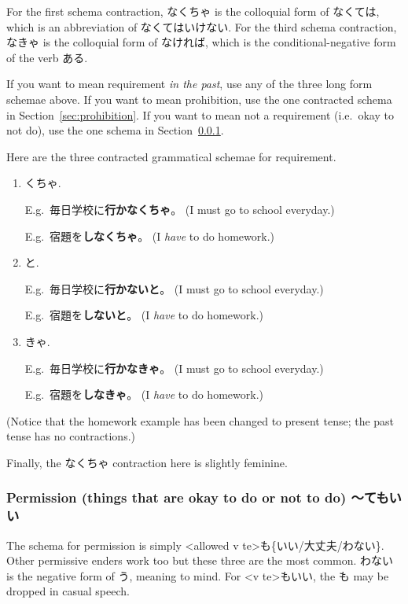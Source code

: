\documentclass[../nihongo-gakushuu-kyouzai-grammar.tex]{subfiles}
\begin{document}
For the first schema contraction, なくちゃ is the colloquial form of なくては, which is an abbreviation of なくてはいけない. For the third schema contraction, なきゃ is the colloquial form of なければ, which is the conditional-negative form of the verb ある. 

 If you want to mean requirement \emph{in the past}, use any of the three long form schemae above. If you want to mean prohibition, use the one contracted schema in Section~\ref{sec:prohibition}. If you want to mean not a requirement (i.e.\ okay to not do), use the one schema in Section~\ref{sec:permission}.

Here are the three contracted grammatical schemae for requirement.
\begin{enumerate}[label=\arabic*.]
    \item <v negative fragment ending in な>くちゃ.

    E.g.\ 毎日学校に\textbf{行かなくちゃ}。 (I must go to school everyday.)

    E.g.\ 宿題を\textbf{しなくちゃ}。 (I \emph{have} to do homework.)
    \item <v negative>と.

    E.g.\ 毎日学校に\textbf{行かないと}。 (I must go to school everyday.)

    E.g.\ 宿題を\textbf{しないと}。 (I \emph{have} to do homework.)

    \item <v negative fragment ending in な>きゃ.

    E.g.\ 毎日学校に\textbf{行かなきゃ}。 (I must go to school everyday.)

    E.g.\ 宿題を\textbf{しなきゃ}。 (I \emph{have} to do homework.)
\end{enumerate}
(Notice that the homework example has been changed to present tense; the past tense has no contractions.)

Finally, the なくちゃ contraction here is slightly feminine.


\subsubsection{Permission (things that are okay to do or not to do) 〜てもいい} \label{sec:permission}
The schema for permission is simply <allowed v te>も\{いい/大丈夫/わない\}. Other permissive enders work too but these three are the most common. わない is the negative form of う, meaning to mind. For <v te>もいい, the も may be dropped in casual speech.
\end{document}
